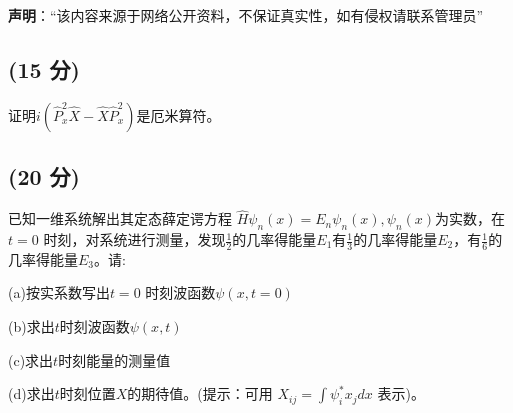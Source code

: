 
\textbf{声明}：“该内容来源于网络公开资料，不保证真实性，如有侵权请联系管理员”

\subsection{(15 分)}
证明$i\left(\hat{P}_x^2\hat{X} - \hat{X}\hat{P}_x^2\right)$是厄米算符。
\subsection{(20 分)}
已知一维系统解出其定态薛定谔方程 $\hat{H} \psi_n(x) = E_n \psi_n(x), \psi_n(x)$为实数，在 $t=0$ 时刻，对系统进行测量，发现$\frac{1}{2}$的几率得能量$E_1$有$\frac{1}{3}$的几率得能量$E_2$，有$\frac{1}{6}$的几率得能量$E_3$。请:

(a)按实系数写出$t=0$ 时刻波函数$\psi(x, t=0)$

(b)求出$t$时刻波函数$\psi(x, t)$

(c)求出$t$时刻能量的测量值

(d)求出$t$时刻位置$X$的期待值。(提示：可用  $X_{ij} = \int \psi_i^* x_j dx$ 表示)。
